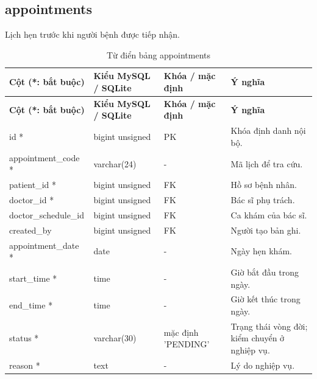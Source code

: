 \clearpage

\subsection{appointments}
Lịch hẹn trước khi người bệnh được tiếp nhận.\allowbreak{}


{\fontsize{10}{12}\selectfont\setlength{\tabcolsep}{3pt}\renewcommand{\arraystretch}{1.12}
\begin{longtable}{@{}L{\textwidth-4.86pt\relax} L{\textwidth-3.96pt\relax} L{\textwidth-2.88pt\relax} L{\textwidth-6.3pt\relax}@{}}
\caption{Từ điển bảng appointments}\\
\toprule
\textbf{Cột (*:\allowbreak{} bắt buộc)} & \textbf{Kiểu My\allowbreak{}SQL /\allowbreak{} SQLite} & \textbf{Khóa /\allowbreak{} mặc định} & \textbf{Ý nghĩa}\\\midrule
\endfirsthead
\toprule
\textbf{Cột (*:\allowbreak{} bắt buộc)} & \textbf{Kiểu My\allowbreak{}SQL /\allowbreak{} SQLite} & \textbf{Khóa /\allowbreak{} mặc định} & \textbf{Ý nghĩa}\\\midrule
\endhead
\bottomrule\endlastfoot
id * & bigint unsigned & PK & Khóa định danh nội bộ.\allowbreak{}\\[1pt]
appointment\_\allowbreak{}code * & varchar(24) & - & Mã lịch để tra cứu.\allowbreak{}\\[1pt]
patient\_\allowbreak{}id * & bigint unsigned & FK & Hồ sơ bệnh nhân.\allowbreak{}\\[1pt]
doctor\_\allowbreak{}id * & bigint unsigned & FK & Bác sĩ phụ trách.\allowbreak{}\\[1pt]
doctor\_\allowbreak{}schedule\_\allowbreak{}id & bigint unsigned & FK & Ca khám của bác sĩ.\allowbreak{}\\[1pt]
created\_\allowbreak{}by & bigint unsigned & FK & Người tạo bản ghi.\allowbreak{}\\[1pt]
appointment\_\allowbreak{}date * & date & - & Ngày hẹn khám.\allowbreak{}\\[1pt]
start\_\allowbreak{}time * & time & - & Giờ bắt đầu trong ngày.\allowbreak{}\\[1pt]
end\_\allowbreak{}time * & time & - & Giờ kết thúc trong ngày.\allowbreak{}\\[1pt]
status * & varchar(30) & mặc định 'PENDING' & Trạng thái vòng đời; kiểm chuyển ở nghiệp vụ.\allowbreak{}\\[1pt]
reason * & text & - & Lý do nghiệp vụ.\allowbreak{}\\[1pt]

\end{longtable}}
